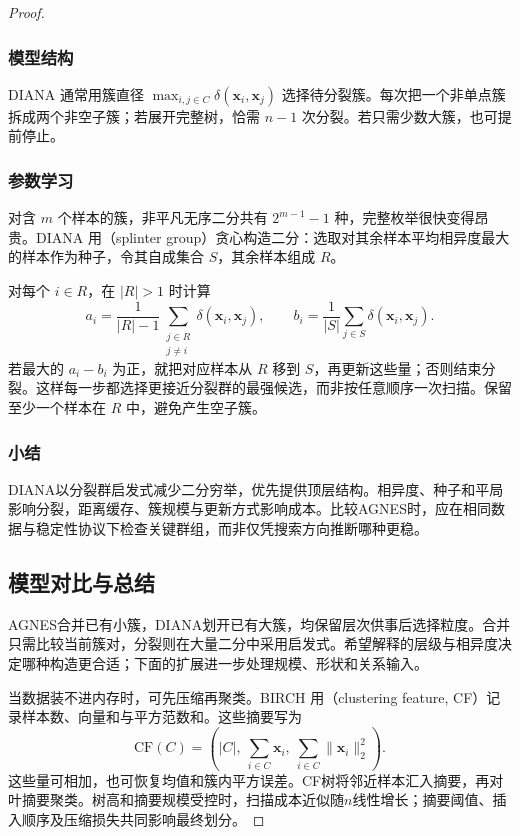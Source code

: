 \begin{proof}
\subsubsection{模型结构}

DIANA 通常用簇直径 $\max_{i,j\in C}\delta(\bm{x}_i,\bm{x}_j)$ 选择待分裂簇。每次把一个非单点簇拆成两个非空子簇；若展开完整树，恰需 $n-1$ 次分裂。若只需少数大簇，也可提前停止。

\subsubsection{参数学习}

对含 $m$ 个样本的簇，非平凡无序二分共有 $2^{m-1}-1$ 种，完整枚举很快变得昂贵。DIANA 用（splinter group）贪心构造二分：选取对其余样本平均相异度最大的样本作为种子，令其自成集合 $S$，其余样本组成 $R$。

对每个 $i\in R$，在 $|R|>1$ 时计算
\[
 a_i=\frac{1}{|R|-1}\sum_{\substack{j\in R\\j\ne i}}
 \delta(\bm{x}_i,\bm{x}_j),\qquad
 b_i=\frac{1}{|S|}\sum_{j\in S}\delta(\bm{x}_i,\bm{x}_j).
\]
若最大的 $a_i-b_i$ 为正，就把对应样本从 $R$ 移到 $S$，再更新这些量；否则结束分裂。这样每一步都选择更接近分裂群的最强候选，而非按任意顺序一次扫描。保留至少一个样本在 $R$ 中，避免产生空子簇。

\subsubsection{小结}

DIANA以分裂群启发式减少二分穷举，优先提供顶层结构。相异度、种子和平局影响分裂，距离缓存、簇规模与更新方式影响成本。比较AGNES时，应在相同数据与稳定性协议下检查关键群组，而非仅凭搜索方向推断哪种更稳。

\subsection{模型对比与总结}

AGNES合并已有小簇，DIANA划开已有大簇，均保留层次供事后选择粒度。合并只需比较当前簇对，分裂则在大量二分中采用启发式。希望解释的层级与相异度决定哪种构造更合适；下面的扩展进一步处理规模、形状和关系输入。

当数据装不进内存时，可先压缩再聚类。BIRCH 用（clustering feature, CF）记录样本数、向量和与平方范数和。这些摘要写为
\[
 \mathrm{CF}(C)=
 \left(|C|,\ \sum_{i\in C}\bm{x}_i,\
 \sum_{i\in C}\lVert\bm{x}_i\rVert_2^2\right).
\]
这些量可相加，也可恢复均值和簇内平方误差。CF树将邻近样本汇入摘要，再对叶摘要聚类。树高和摘要规模受控时，扫描成本近似随$n$线性增长；摘要阈值、插入顺序及压缩损失共同影响最终划分。


\end{proof}
